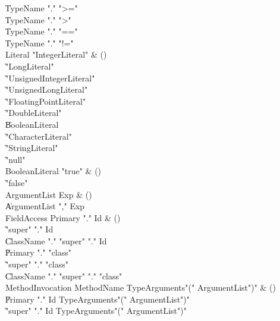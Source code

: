 \begin{bbgrammar}

    \| TypeName \xcd"." \xcd">="\\
    \| TypeName \xcd"." \xcd">"\\
    \| TypeName \xcd"." \xcd"=="\\
    \| TypeName \xcd"." \xcd"!="\\
 Literal  \label{prod:Literal}  \: \xcd"IntegerLiteral"  & ()\\
    \| \xcd"LongLiteral" \\
    \| \xcd"UnsignedIntegerLiteral" \\
    \| \xcd"UnsignedLongLiteral" \\
    \| \xcd"FloatingPointLiteral" \\
    \| \xcd"DoubleLiteral" \\
    \| BooleanLiteral\\
    \| \xcd"CharacterLiteral" \\
    \| \xcd"StringLiteral" \\
    \| \xcd"null"\\
 BooleanLiteral  \label{prod:BooleanLiteral}  \: \xcd"true"  & ()\\
    \| \xcd"false" \\
 ArgumentList  \label{prod:ArgumentList}  \: Exp & ()\\
    \| ArgumentList \xcd"," Exp\\
 FieldAccess  \label{prod:FieldAccess}  \: Primary \xcd"." Id & ()\\
    \| \xcd"super" \xcd"." Id\\
    \| ClassName \xcd"." \xcd"super"  \xcd"." Id\\
    \| Primary \xcd"." \xcd"class" \\
    \| \xcd"super" \xcd"." \xcd"class" \\
    \| ClassName \xcd"." \xcd"super"  \xcd"." \xcd"class" \\
 MethodInvocation  \label{prod:MethodInvocation}  \: MethodName TypeArguments\opt \xcd"(" ArgumentList\opt \xcd")" & ()\\
    \| Primary \xcd"." Id TypeArguments\opt \xcd"(" ArgumentList\opt \xcd")"\\
    \| \xcd"super" \xcd"." Id TypeArguments\opt \xcd"(" ArgumentList\opt \xcd")"\\

\end{bbgrammar}
